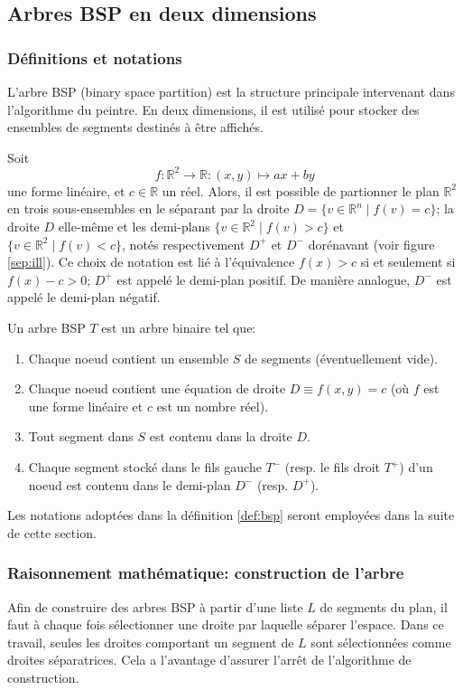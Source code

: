 \subsection{Arbres BSP en deux dimensions}
\subsubsection*{Définitions et notations}
L'arbre BSP (binary space partition) est la structure principale
intervenant dans l'algorithme du peintre. En deux dimensions, il est
utilisé pour stocker des ensembles de segments destinés à être affichés.


Soit
\begin{equation} \label{lin:forme}
f: \mathbb R^2 \to \mathbb R: (x, y)\mapsto ax +by
\end{equation}
une forme linéaire, et $c\in\mathbb R$ un réel. Alors, il est possible de
partionner le plan $\mathbb R^2$ en trois sous-ensembles en le séparant
par la droite $D = \{v\in\mathbb R^n\mid f(v) = c\}$;
la droite $D$ elle-même et les demi-plans
$\{v\in\mathbb R^2\mid f(v) > c\}$ et
$\{v\in\mathbb R^2\mid f(v) < c\}$, notés respectivement $D^+$ et $D^-$
dorénavant
(voir figure \ref{sep:ill}). Ce choix de notation est lié à l'équivalence
$f(x)> c$ si et seulement si $f(x)-c>0$; $D^+$ est appelé
le demi-plan positif. De manière analogue, $D^-$ est
appelé le demi-plan négatif.




\begin{df}\label{def:bsp}
  Un arbre BSP $T$ est un arbre binaire tel que:
  \begin{enumerate}
  \item Chaque noeud contient un ensemble $S$ de segments (éventuellement
    vide).
  \item Chaque noeud contient une équation de droite $D\equiv f(x, y) = c$
    (où $f$ est une forme linéaire et $c$ est un nombre réel).
  \item Tout segment dans $S$ est contenu dans la droite $D$.
  \item Chaque segment stocké dans le fils gauche $T^-$ (resp.
    le fils droit $T^+$) d'un noeud est contenu dans le demi-plan
    $D^-$ (resp. $D^+$).
  \end{enumerate}
\end{df}
Les notations adoptées dans la définition \ref{def:bsp} seront employées
dans la suite de cette section.

\subsubsection*{Raisonnement mathématique: construction de l'arbre}
Afin de construire des arbres BSP à partir d'une liste $L$ de segments
du plan, il faut à chaque fois sélectionner une droite par laquelle
séparer l'espace.
Dans ce travail, seules les droites comportant un segment de $L$ sont
sélectionnées comme droites séparatrices. Cela a l'avantage d'assurer
l'arrêt de l'algorithme de construction.

